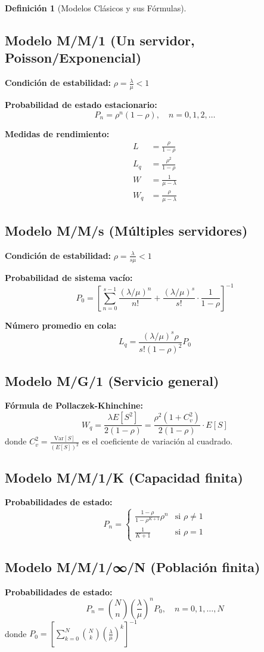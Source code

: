 \documentclass[12pt, a4paper, oneside]{book}
\theoremstyle{definition}
\newtheorem{definicion}{Definición}[chapter]
\begin{document}
\begin{definicion}[Modelos Clásicos y sus Fórmulas]

\subsection{Modelo M/M/1 (Un servidor, Poisson/Exponencial)}
\textbf{Condición de estabilidad:} $\rho = \frac{\lambda}{\mu} < 1$

\textbf{Probabilidad de estado estacionario:}
$$P_n = \rho^n (1-\rho), \quad n = 0, 1, 2, \ldots$$

\textbf{Medidas de rendimiento:}
\begin{align}
L &= \frac{\rho}{1-\rho} \\
L_q &= \frac{\rho^2}{1-\rho} \\
W &= \frac{1}{\mu - \lambda} \\
W_q &= \frac{\rho}{\mu - \lambda}
\end{align}

\subsection{Modelo M/M/s (Múltiples servidores)}
\textbf{Condición de estabilidad:} $\rho = \frac{\lambda}{s\mu} < 1$

\textbf{Probabilidad de sistema vacío:}
$$P_0 = \left[\sum_{n=0}^{s-1} \frac{(\lambda/\mu)^n}{n!} + \frac{(\lambda/\mu)^s}{s!} \cdot \frac{1}{1-\rho}\right]^{-1}$$

\textbf{Número promedio en cola:}
$$L_q = \frac{(\lambda/\mu)^s \rho}{s!(1-\rho)^2} P_0$$

\subsection{Modelo M/G/1 (Servicio general)}
\textbf{Fórmula de Pollaczek-Khinchine:}
$$W_q = \frac{\lambda E[S^2]}{2(1-\rho)} = \frac{\rho^2(1+C_v^2)}{2(1-\rho)} \cdot E[S]$$
donde $C_v^2 = \frac{\text{Var}[S]}{(E[S])^2}$ es el coeficiente de variación al cuadrado.

\subsection{Modelo M/M/1/K (Capacidad finita)}
\textbf{Probabilidades de estado:}
$$P_n = \begin{cases}
\frac{1-\rho}{1-\rho^{K+1}} \rho^n & \text{si } \rho \neq 1 \\
\frac{1}{K+1} & \text{si } \rho = 1
\end{cases}$$

\subsection{Modelo M/M/1/∞/N (Población finita)}
\textbf{Probabilidades de estado:}
$$P_n = \binom{N}{n} \left(\frac{\lambda}{\mu}\right)^n P_0, \quad n = 0, 1, \ldots, N$$
donde $P_0 = \left[\sum_{k=0}^{N} \binom{N}{k} \left(\frac{\lambda}{\mu}\right)^k\right]^{-1}$
\end{definicion}
\end{document}
